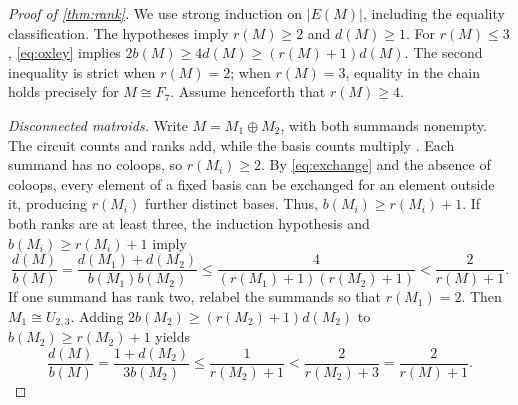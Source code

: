 \documentclass[11pt]{article}
\numberwithin{equation}{section}
\begin{document}
\begin{proof}[Proof of \autoref{thm:rank}]
We use strong induction on \(|E(M)|\), including the equality classification.
The hypotheses imply \(r(M)\ge2\) and \(d(M)\ge1\).
For \(r(M)\le3\), \eqref{eq:oxley} implies
\(2b(M)\ge4d(M)\ge(r(M)+1)d(M)\).
The second inequality is strict when \(r(M)=2\); when \(r(M)=3\),
equality in the chain holds precisely for \(M\cong F_7\).
Assume henceforth that \(r(M)\ge4\).

\emph{Disconnected matroids.}
Write \(M=M_1\oplus M_2\), with both summands nonempty.
The circuit counts and ranks add, while the basis counts multiply
\cite[(4.2.12)--(4.2.14)]{Oxley2011}.
Each summand has no coloops, so \(r(M_i)\ge2\).
By \eqref{eq:exchange} and the absence of coloops, every element of a
fixed basis can be exchanged for an element outside it, producing
\(r(M_i)\) further distinct bases.
Thus, \(b(M_i)\ge r(M_i)+1\).
If both ranks are at least three, the induction hypothesis and
\(b(M_i)\ge r(M_i)+1\) imply
\[
 \frac{d(M)}{b(M)}
 =\frac{d(M_1)+d(M_2)}{b(M_1)b(M_2)}
 \le\frac4{(r(M_1)+1)(r(M_2)+1)}
 <\frac2{r(M)+1}.
\]
If one summand has rank two, relabel the summands so that
\(r(M_1)=2\). Then \(M_1\cong U_{2,3}\).
Adding \(2b(M_2)\ge(r(M_2)+1)d(M_2)\) to
\(b(M_2)\ge r(M_2)+1\) yields
\[
 \frac{d(M)}{b(M)}
 =\frac{1+d(M_2)}{3b(M_2)}
 \le\frac1{r(M_2)+1}
 <\frac2{r(M_2)+3}=\frac2{r(M)+1}.
\]


\end{proof}
\end{document}
